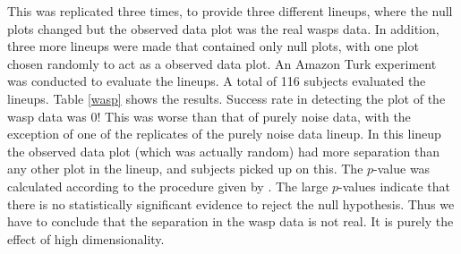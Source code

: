 This was replicated three times, to provide three different lineups, where the null plots changed but the observed data plot was the real wasps data. In addition, three more lineups were made that contained only null plots, with one plot chosen randomly to act as a observed data plot. An Amazon Turk experiment was conducted to evaluate the lineups.  A total of 116 subjects evaluated the lineups. Table \ref{wasp} shows the results. Success rate in detecting the plot of the wasp data was 0! This was worse than that of purely noise data, with the exception of one of the replicates of the purely noise data lineup. In this lineup the observed data plot (which was actually random) had more separation than any other plot in the lineup, and subjects picked up on this. The $p$-value was calculated according to the procedure given by \cite{majumder:2011}. The large $p$-values indicate that there is no statistically significant evidence to reject the null hypothesis. Thus we have to conclude that the separation in the wasp data is not real. It is purely the effect of high dimensionality. 






